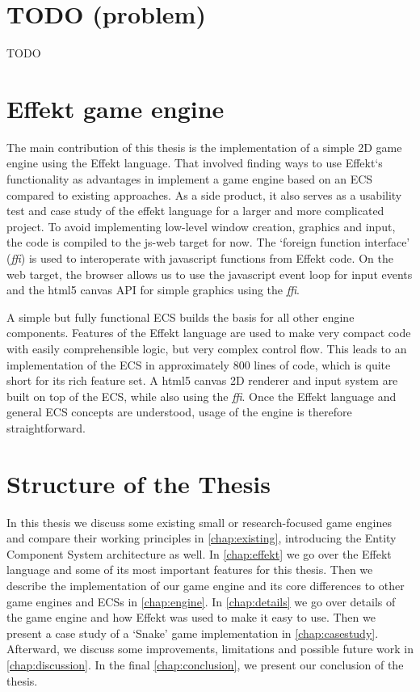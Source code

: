 \section*{TODO (problem)}

TODO

\section*{Effekt game engine}

The main contribution of this thesis is the implementation of a simple 2D game engine using the Effekt language. That involved finding ways to use Effekt`s functionality as advantages in implement a game engine based on an ECS compared to existing approaches. As a side product, it also serves as a usability test and case study of the effekt language for a larger and more complicated project. To avoid implementing low-level window creation, graphics and input, the code is compiled to the \textsf{js-web} target for now. The `foreign function interface' (\textit{ffi}) is used to interoperate with javascript functions from Effekt code. On the web target, the browser allows us to use the javascript event loop for input events and the html5 \textsf{canvas} API for simple graphics using the \textit{ffi}.

A simple but fully functional ECS builds the basis for all other engine components. Features of the Effekt language are used to make very compact code with easily comprehensible logic, but very complex control flow. This leads to an implementation of the ECS in approximately 800 lines of code, which is quite short for its rich feature set. A html5 \textsf{canvas} 2D renderer and input system are built on top of the ECS, while also using the \textit{ffi}. Once the Effekt language and general ECS concepts are understood, usage of the engine is therefore straightforward.

\section*{Structure of the Thesis}

In this thesis we discuss some existing small or research-focused game engines and compare their working principles in \cref{chap:existing}, introducing the Entity Component System architecture as well. In \cref{chap:effekt} we go over the Effekt language and some of its most important features for this thesis. Then we describe the implementation of our game engine and its core differences to other game engines and ECSs in \cref{chap:engine}. In \cref{chap:details} we go over details of the game engine and how Effekt was used to make it easy to use. Then we present a case study of a `Snake' game implementation in \cref{chap:casestudy}. Afterward, we discuss some improvements, limitations and possible future work in \cref{chap:discussion}. In the final \cref{chap:conclusion}, we present our conclusion of the thesis.
